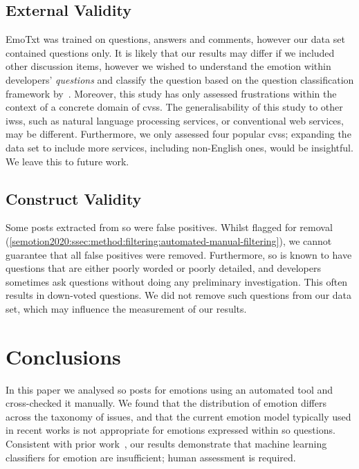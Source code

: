 \subsection{External Validity}
EmoTxt was trained on questions, answers and comments, however our data set contained questions only. It is likely that our results may differ if we included other discussion items, however we wished to understand the emotion within developers' \textit{questions} and classify the question based on the question classification framework by~\citet{Beyer:2018fm}. Moreover, this study has only assessed frustrations within the context of a concrete domain of \glspl{cvs}. The generalisability of this study to other \glspl{iws}, such as natural language processing services, or conventional web services, may be different. Furthermore, we only assessed four popular \glspl{cvs}; expanding the data set to include more services, including non-English ones, would be insightful. We leave this to future work.

\subsection{Construct Validity}
Some posts extracted from \gls{so} were false positives. Whilst flagged for removal (\cref{semotion2020:ssec:method:filtering:automated-manual-filtering}), we cannot guarantee that all false positives were removed. Furthermore, \gls{so} is known to have questions that are either poorly worded or poorly detailed, and developers sometimes ask questions without doing any preliminary investigation. This often results in down-voted questions. We did not remove such questions from our data set, which may influence the measurement of our results.


\section{Conclusions}\label{semotion2020:sec:conclusion}

In this paper we analysed \gls{so} posts for emotions using an automated tool and cross-checked it manually. We found that the distribution of emotion differs across the taxonomy of issues, and that the current emotion model typically used in recent works is not appropriate for emotions expressed within \gls{so} questions. Consistent with prior work~\citep{lin2018sentiment}, our results demonstrate that machine learning classifiers for emotion are insufficient; human assessment is required.

